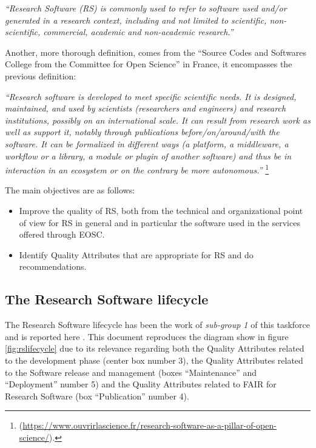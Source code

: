 \textit{``Research Software (RS) is commonly used to refer to software used and/or generated in a research context, including and not limited to scientific, non-scientific, commercial, academic and non-academic research.''}

Another, more thorough definition, comes from the ``Source Codes and Softwares College from the Committee for Open
Science'' in France, it encompasses the previous definition:

\textit{``Research software is developed to meet specific scientific needs. It is designed, maintained, and used by scientists (researchers and engineers) and research institutions, possibly on an international scale. It can result from research work as well as support it, notably through publications before/on/around/with the software. It can be formalized in different ways (a platform, a middleware, a workflow or a library, a module or plugin of another software) and thus be in interaction in an ecosystem or on the contrary be more autonomous.''} \footnote{(\url{https://www.ouvrirlascience.fr/research-software-as-a-pillar-of-open-science/}).}

\label{def_rs}

The main objectives are as follows:

\begin{itemize}
    \item Improve the quality of RS, both from the technical and organizational point of view for RS in general and in particular the software used in the services offered through EOSC.
    \item Identify Quality Attributes that are appropriate for RS and do recommendations.
\end{itemize}

\subsection{The Research Software lifecycle}

The Research Software lifecycle has been the work of \textit{sub-group 1} of this taskforce and is reported here \cite{sg1tf2023}. This document reproduces the diagram show in figure \ref{fig:rslifecycle} due to its relevance regarding both the Quality Attributes related to the development phase (center box number 3), the Quality Attributes related to the Software release and management (boxes ``Maintenance'' and ``Deployment'' number 5) and the Quality Attributes related to FAIR for Research Software (box ``Publication'' number 4).

